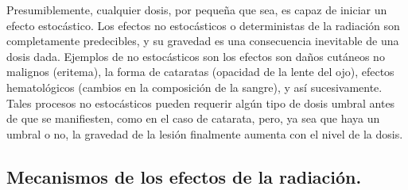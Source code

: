 \documentclass[]{article}
\begin{document}
Presumiblemente, cualquier dosis, por pequeña que sea, es capaz de iniciar un efecto estocástico. Los efectos no estocásticos o deterministas de la radiación son completamente predecibles, y su gravedad es una consecuencia inevitable de una dosis dada. Ejemplos de no estocásticos son los efectos son daños cutáneos no malignos (eritema), la forma de cataratas (opacidad de la lente del ojo), efectos hematológicos (cambios en la composición de la sangre), y así sucesivamente. Tales procesos no estocásticos pueden requerir algún tipo de dosis umbral antes de que se manifiesten, como en el caso de catarata, pero, ya sea que haya un umbral o no, la gravedad de la lesión finalmente aumenta con el nivel de la dosis.\\



\begin{figure}[h!]
	\begin{minipage}[t][3.5cm]{\textwidth}
		\begin{center}
			\smartdiagramset{
				back arrow disabled=true,
				additions={
					additional item offset=0.85cm,
					additional item border color=blue,
				}
			}
		\end{center}
	\end{minipage}
	\caption{}
	\label{efectosRadiacion}
\end{figure}

\subsection{Mecanismos de los efectos de la radiación.}
\end{document}

